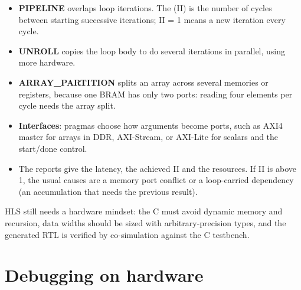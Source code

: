 \begin{itemize}
  \item \textbf{PIPELINE} overlaps loop iterations. The  (II) is the number of cycles between starting successive iterations; II = 1 means a new iteration every cycle.
  \item \textbf{UNROLL} copies the loop body to do several iterations in parallel, using more hardware.
  \item \textbf{ARRAY\_PARTITION} splits an array across several memories or registers, because one BRAM has only two ports: reading four elements per cycle needs the array split.
  \item \textbf{Interfaces}: pragmas choose how arguments become ports, such as AXI4 master for arrays in DDR, AXI-Stream, or AXI-Lite for scalars and the start/done control.
  \item The reports give the latency, the achieved II and the resources. If II is above 1, the usual causes are a memory port conflict or a loop-carried dependency (an accumulation that needs the previous result).
\end{itemize}

HLS still needs a hardware mindset: the C must avoid dynamic memory and recursion, data widths should be sized with arbitrary-precision types, and the generated RTL is verified by co-simulation against the C testbench.

\section{Debugging on hardware}

